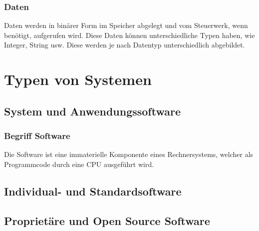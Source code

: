 \documentclass{article}
\begin{document}
\begin{adjustwidth}{2em}{2em}
\begin{adjustwidth}{2em}{2em}
\begin{adjustwidth}{1em}{}
				\subsubsection{Daten}
				\begin{adjustwidth}{1em}{}
					Daten werden in binärer Form im Speicher abgelegt und vom Steuerwerk, wenn benötigt, aufgerufen wird. Diese Daten können unterschiedliche Typen haben, wie Integer, String usw. Diese werden je nach Datentyp unterschiedlich abgebildet.
				\end{adjustwidth}
			\end{adjustwidth}
		\end{adjustwidth}
		
		\section{Typen von Systemen}
		\begin{adjustwidth}{2em}{2em}
			\subsection{System und Anwendungssoftware}
			\begin{adjustwidth}{1em}{}
				\subsubsection{Begriff Software}
				\begin{adjustwidth}{1em}{}
					Die Software ist eine immaterielle Komponente eines Rechnersystems, welcher als Programmcode durch eine CPU ausgeführt wird.
				\end{adjustwidth}
			\end{adjustwidth}
			\subsection{Individual- und Standardsoftware}
			\begin{adjustwidth}{1em}{}
			\end{adjustwidth}
			\subsection{Proprietäre und Open Source Software}
			\begin{adjustwidth}{1em}{}
			\end{adjustwidth}
		\end{adjustwidth}
	\end{adjustwidth}
	
\end{document}
